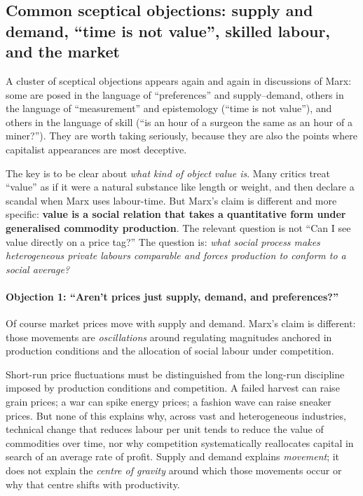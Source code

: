\subsection{Common sceptical objections: supply and demand, ``time is not value'', skilled labour, and the market}
\label{sec:objections-measuring-value}

A cluster of sceptical objections appears again and again in discussions of Marx: some are posed in the language
of ``preferences'' and supply--demand, others in the language of ``measurement'' and epistemology (``time is not
value''), and others in the language of skill (``is an hour of a surgeon the same as an hour of a miner?'').
They are worth taking seriously, because they are also the points where capitalist appearances are most deceptive.

The key is to be clear about \emph{what kind of object value is}. Many critics treat ``value'' as if it were a
natural substance like length or weight, and then declare a scandal when Marx uses labour-time. But Marx’s claim
is different and more specific: \textbf{value is a social relation that takes a quantitative form under generalised
commodity production}. The relevant question is not ``Can I see value directly on a price tag?'' The question is:
\emph{what social process makes heterogeneous private labours comparable and forces production to conform to a social
average?}

\paragraph{Objection 1: ``Aren’t prices just supply, demand, and preferences?''}
Of course market prices move with supply and demand. Marx’s claim is different: those movements are \emph{oscillations}
around regulating magnitudes anchored in production conditions and the allocation of social labour under competition.\cite{Marx1867,Shaikh2016}

Short-run price fluctuations must be distinguished from the long-run
discipline imposed by production conditions and competition. A failed
harvest can raise grain prices; a war can spike energy prices; a fashion wave can raise sneaker prices. But none of this
explains why, across vast and heterogeneous industries, technical change that reduces labour per unit tends to reduce the
value of commodities over time, nor why competition systematically reallocates capital in search of an average rate of profit.\cite{Marx1867,Shaikh2016}
Supply and demand explains \emph{movement}; it does not explain the \emph{centre of gravity} around which those movements occur
or why that centre shifts with productivity.

